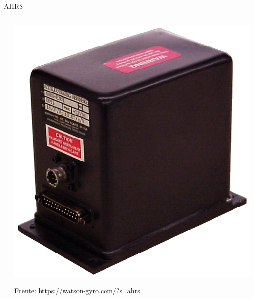 \begin{frame}{AHRS}
\begin{columns}
\begin{column}{0.6\textwidth}
\end{column}
\begin{column}{0.4\textwidth}
\includegraphics[height=0.45\textheight]{05.instrumentos.giroscopicos.imagenes/05.06.central.giroscopica/05-06-AHRS-E304_product.png}

      {\tiny Fuente: \url{https://watson-gyro.com/?s=ahrs} }

\end{column}
\end{columns}

\end{frame}

  
